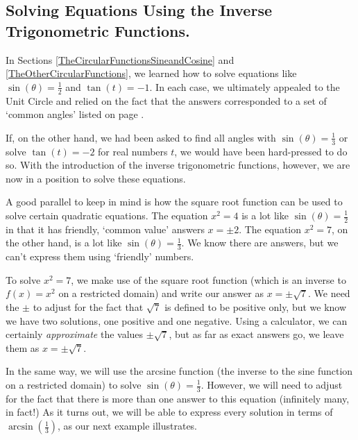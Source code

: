\documentclass{ximera}
\begin{document}
\subsection{Solving Equations Using the Inverse Trigonometric Functions.}

In Sections \ref{TheCircularFunctionsSineandCosine} and \ref{TheOtherCircularFunctions}, we learned how to solve equations like $\sin(\theta) = \frac{1}{2}$  and $\tan(t) = -1$. In each case, we ultimately appealed to the Unit Circle and relied on the fact that the answers corresponded to a set of `common angles' listed on page \pageref{commonanglesunitcircle}. 

\smallskip

 If, on the other hand, we had been asked to find all angles with $\sin(\theta) = \frac{1}{3}$ or solve $\tan(t) = -2$ for real numbers $t$, we would have been hard-pressed to do so.  With the introduction of the inverse trigonometric functions, however, we are now in a position to solve these equations. 
 
 \smallskip
 
 A good parallel to keep in mind is how the square root function can be used to solve certain quadratic equations.  The equation $x^2 = 4$ is a lot like  $\sin(\theta) = \frac{1}{2}$ in that it has friendly, `common value' answers  $x = \pm 2$.   The equation $x^2 = 7$, on the other hand, is a lot like $\sin(\theta) = \frac{1}{3}$.  We know there are answers, but we can't express them using `friendly' numbers.  
 
 \smallskip
 
 To solve $x^2 = 7$, we make use of the square root function (which is an inverse to $f(x) = x^2$ on a restricted domain) and write our answer as  $x = \pm \sqrt{7}$.  We need  the $\pm$ to  adjust for the fact that $\sqrt{7}$ is defined to be positive only, but we know we have two solutions, one positive and one negative.    Using a  calculator, we can certainly \textit{approximate} the values $\pm \sqrt{7}$,  but as far as exact answers go, we leave them as $x = \pm \sqrt{7}$.  
  
  \smallskip
  
In the same way, we will use the arcsine function (the inverse to the sine function on a restricted domain)  to solve $\sin(\theta) = \frac{1}{3}$.  However, we will need to adjust for the fact that there is more than one answer to this equation (infinitely many, in fact!)  As it turns out, we will be able to express every solution in terms of $\arcsin\left(\frac{1}{3}\right)$, as our next example illustrates.
\end{document}
